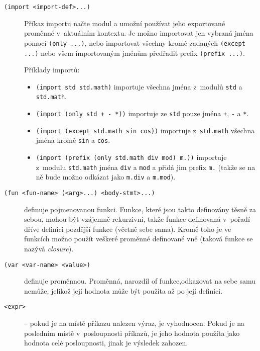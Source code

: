 \begin{description}

\item[\texttt{(import <import-def>...)}] Příkaz importu načte modul a umožní
  používat jeho exportované proměnné v~aktuálním kontextu. Je možno importovat jen
  vybraná jména pomocí \texttt{(only ...)}, nebo importovat všechny kromě zadaných
  \texttt{(except ...)} nebo všem importovaným jménům předřadit prefix
  \texttt{(prefix ...)}.

  Příklady importů:

  \begin{itemize}
    \item \texttt{(import std std.math)} importuje všechna jména z~modulů
      \texttt{std} a \texttt{std.math}.
    \item \texttt{(import (only std + - *))} importuje ze \texttt{std} pouze jména
      \texttt{+}, \texttt{-} a \texttt{*}.
    \item \texttt{(import (except std.math sin cos))} importuje
      z~\texttt{std.math} všechna jména kromě \texttt{sin} a \texttt{cos}.
    \item \texttt{(import (prefix (only std.math div mod) m.))} importuje z~modulu
      \texttt{std.math} jména \texttt{div} a \texttt{mod} a přidá jim prefix
      \texttt{m.} (takže se na ně bude možno odkázat jako \texttt{m.div} a
      \texttt{m.mod}).
  \end{itemize}

\item[\texttt{(fun <fun-name> (<arg>...) <body-stmt>...)}] definuje pojmenovanou
  funkci. Funkce, které jsou takto definovány těsně za sebou, mohou být vzájemně
  rekurzivní, takže funkce definovaná v~pořadí dříve  definici pozdější
  funkce (včetně sebe sama). Kromě toho je ve funkcích možno použít veškeré
  proměnné definované vně (taková funkce se nazývá \emph{closure}).

\item[\texttt{(var <var-name> <value>)}] definuje proměnnou. Proměnná, narozdíl
  of funkce,odkazovat na sebe samu nemůže, jelikož její hodnota může být použíta
  až po její definici.

\item[\texttt{<expr>}] -- pokud je na místě příkazu nalezen výraz, je vyhodnocen.
  Pokud je na posledním místě v~posloupnosti příkazů, je jeho hodnota použíta jako
  hodnota celé posloupnosti, jinak je výsledek zahozen.

\end{description}

